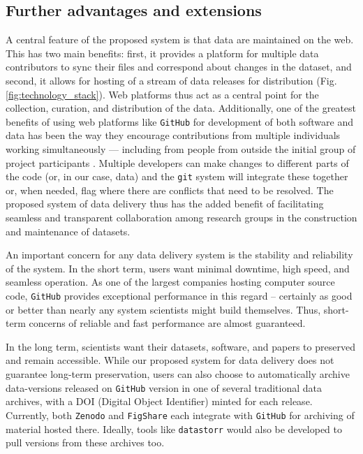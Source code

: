\documentclass[a4paper,num-refs]{oup-contemporary}
\begin{document}
\subsection{Further advantages and extensions}

A central feature of the proposed system is that data are maintained on the web. This has two main benefits: first, it provides a platform for multiple data contributors to sync their files and correspond about changes in the dataset, and second, it allows for hosting of a stream of data releases for distribution (Fig. \ref{fig:technology_stack}). Web platforms thus act as a central point for the collection, curation, and distribution of the data. Additionally, one of the greatest benefits of using web platforms like \texttt{GitHub} for development of both software and data has been the way they encourage contributions from multiple individuals working simultaneously --- including from people from outside the initial group of project participants \cite{Rogers-2013, Perkel-2016}. Multiple developers can make changes to different parts of the code (or, in our case, data) and the \texttt{git} system will integrate these together or, when needed, flag where there are conflicts that need to be resolved. The proposed system of data delivery thus has the added benefit of facilitating seamless and transparent collaboration among research groups in the construction and maintenance of datasets.

An important concern for any data delivery system is the stability and reliability of the system. In the short term, users want minimal downtime, high speed, and seamless operation. As one of the largest companies hosting computer source code, \texttt{GitHub} provides exceptional performance in this regard -- certainly as good or better than nearly any system scientists might build themselves. Thus, short-term concerns of reliable and fast performance are almost guaranteed.

In the long term, scientists want their datasets, software, and papers to preserved and remain accessible. While our proposed system for data delivery does not guarantee long-term preservation, users can also choose to automatically archive data-versions released on \texttt{GitHub} version in one of several traditional data archives, with a DOI (Digital Object Identifier) minted for each release. Currently, both \texttt{Zenodo} and  \texttt{FigShare} each integrate with \texttt{GitHub} for archiving of material hosted there. Ideally, tools like \texttt{datastorr} would also be developed to pull versions from these archives too. 
\end{document}
